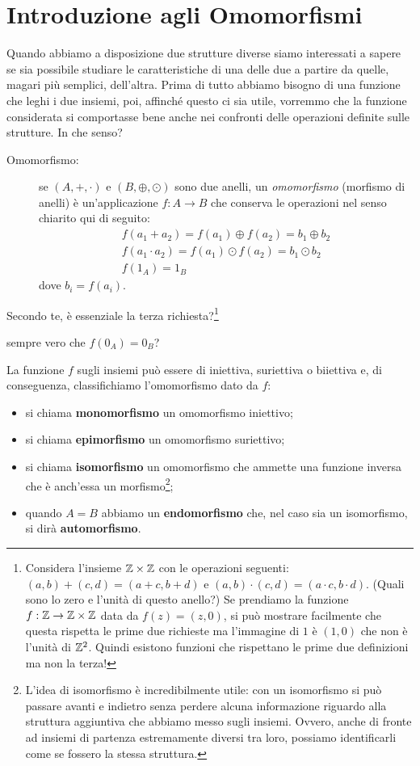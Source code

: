 	
	\section{Introduzione agli Omomorfismi}
		
		Quando abbiamo a disposizione due strutture diverse siamo interessati a sapere se sia possibile studiare le caratteristiche di una delle due a partire da quelle, magari più semplici, dell'altra.
		Prima di tutto abbiamo bisogno di una funzione che leghi i due insiemi, poi, affinché questo  ci sia utile, vorremmo che la funzione considerata si comportasse bene anche nei confronti delle operazioni definite sulle strutture. In che senso?
		\begin{description}
			\item[Omomorfismo:] se $(A,+,\cdot)$ e $(B,\oplus,\odot)$ sono due anelli, un \emph{omomorfismo} (morfismo di anelli) è un’applicazione $f:A\to B$ che conserva le operazioni nel senso chiarito qui di seguito:
			\begin{gather*}	
				f(a_1+a_2)=f(a_1)\oplus f(a_2)=b_1\oplus b_2  \\
				f(a_1\cdot a_2)=f(a_1)\odot f(a_2)=b_1\odot b_2 \\
				f(1_A)=1_B
			\end{gather*}
			dove $b_i=f(a_i)$.
		\end{description}
		\begin{es}[*]
			Secondo te, è essenziale la terza richiesta?\footnote{Considera l'insieme $\mathbb{Z}\times\mathbb{Z}$ con le operazioni seguenti: $(a,b)+(c,d)=(a+c,b+d)$ e $(a,b)\cdot(c,d)=(a\cdot c,b\cdot d)$. (Quali sono lo zero e l'unità di questo anello?) Se prendiamo la funzione $f:\mathbb{Z}\to\mathbb{Z}\times\mathbb{Z}$ data da $f(z)=(z,0)$, si può mostrare facilmente che questa rispetta le prime due richieste ma l'immagine di $1$ è $(1,0)$ che non è l'unità di $\mathbb{Z}^2$. Quindi esistono funzioni che rispettano le prime due definizioni ma non la terza!}
		\end{es}
		\begin{es}
			\Egrave sempre vero che $f(0_A)=0_B$?
		\end{es}
		La funzione $f$ sugli insiemi può essere di iniettiva, suriettiva o biiettiva e, di conseguenza, classifichiamo l'omomorfismo dato da $f$:
		\begin{itemize}
			\item si chiama \textbf{monomorfismo} un omomorfismo iniettivo;
			\item si chiama \textbf{epimorfismo} un omomorfismo suriettivo;
			\item si chiama \textbf{isomorfismo} un omomorfismo che ammette una funzione inversa che è anch'essa un morfismo\footnote{L'idea di isomorfismo è incredibilmente utile: con un isomorfismo si può passare avanti e indietro senza perdere alcuna informazione riguardo alla struttura aggiuntiva che abbiamo messo sugli insiemi. Ovvero, anche di fronte ad insiemi di partenza estremamente diversi tra loro, possiamo identificarli come se fossero la stessa struttura.};
			\item quando $A=B$ abbiamo un \textbf{endomorfismo} che, nel caso sia un isomorfismo, si dirà \textbf{automorfismo}.
		\end{itemize}
